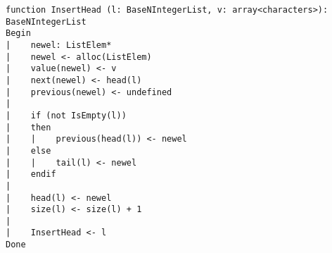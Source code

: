 \begin{lstlisting}[breaklines]
function InsertHead (l: BaseNIntegerList, v: array<characters>): BaseNIntegerList
Begin
|    newel: ListElem*
|    newel <- alloc(ListElem)
|    value(newel) <- v
|    next(newel) <- head(l)
|    previous(newel) <- undefined
|
|    if (not IsEmpty(l))
|    then
|    |    previous(head(l)) <- newel
|    else
|    |    tail(l) <- newel
|    endif
|
|    head(l) <- newel
|    size(l) <- size(l) + 1
|
|    InsertHead <- l
Done
\end{lstlisting}

